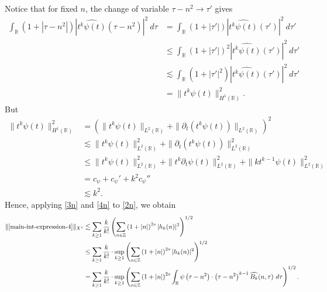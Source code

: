 \documentclass[12pt,reqno]{amsart}
\numberwithin{equation}{section}  %
\numberwithin{figure}{section}
\newcommand{\rr}{\mathbb{R}}
\newcommand{\zz}{\mathbb{Z}}
\newcommand{\wh}{\widehat}
\newcommand{\p}{\partial}
\theoremstyle{plain}
\theoremstyle{definition}
\theoremstyle{remark}
\begin{document}
%
%
Notice that for fixed $n$, the change of variable $\tau - n^{2} \to \tau'$
gives
%
%
\begin{equation}
  \label{3n}
  \begin{split}
    \int_\rr \left( 1 + | \tau - n^{2} | \right) | \wh{t^{k}
    \psi(t)}\left( \tau - n^{2} \right) |^2 \ d \tau
    & = \int_\rr \left( 1 + |\tau'| \right) | \wh{t^k \psi(t)}(\tau') |^2 \
    d \tau'
    \\
    & \le \int_\rr \left( 1 + |\tau'| \right)^2 | \wh{t^k \psi(t)}(\tau')
    |^2 \ d \tau'
    \\
    & \lesssim \int_\rr \left( 1 + | \tau' |^2 \right) | \wh{t^{k}
    \psi(t)}(\tau') |^2 \ d \tau'
    \\
    & = \|t^k \psi(t) \|_{H^1(\rr)}^2.
  \end{split}
\end{equation}
%
%
But
%
%
\begin{equation}
  \label{4n}
  \begin{split}
    \|t^k \psi(t) \|_{H^1(\rr)}^2
    & = \left( \|t^k \psi(t)\|_{L^2(\rr)} + \|\p_t \left( t^k \psi(t)
    \right)\|_{L^2(\rr)} \right)^2
    \\
    & \lesssim \|t^{k}\psi(t) \|_{L^2(\rr)}^2 + \|\p_t \left (t^{k}
    \psi(t) \right )\|_{L^2(\rr)}^2
    \\
    & \le \|t^k \psi(t) \|_{L^2(\rr)}^2 + \|t^k \p_t \psi(t)
    \|_{L^2(\rr)}^2 + \|k t^{k -1} \psi(t) \|_{L^2(\rr)}^2
    \\
    & = c_{\psi} + c_{\psi}' + k^2 c_{\psi}''
    \\
    & \lesssim k^2.
  \end{split}
\end{equation}
%
%
Hence, applying \eqref{3n} and \eqref{4n} to \eqref{2n}, we obtain
%
\begin{equation}
  \label{5n}
  \begin{split}
    \|\eqref{main-int-expression-4} \|_{X^s}
    & \lesssim
    \sum_{k \ge 1} \frac{k}{k!} \left( \sum_{n \in \zz} \left (1 + |n| \right )^{2s} | h_k(n) |^2 
    \right)^{1/2}
    \\
    & \le \sum_{k \ge 1} \frac{k}{k!}
    \cdot \sup_{k \ge 1} \left( \sum_{n \in \zz} \left (1 + |n| \right )^{2s} | 
    h_k(n) |^2 \right)^{1/2}
    \\
    & = \sum_{k \ge 1} \frac{k}{k!} \cdot \sup_{k \ge 1} 
    \left( \sum_{n \in \zz} \left (1 + |n| \right )^{2s} \int_\rr 
    \psi\left( \tau - n^{2} \right) \cdot \left( \tau - n^{2} 
    \right)^{k -1} \wh{{B_k}}(n, \tau) \ d \tau \right)^{1/2}.
  \end{split}
\end{equation}
\end{document}
